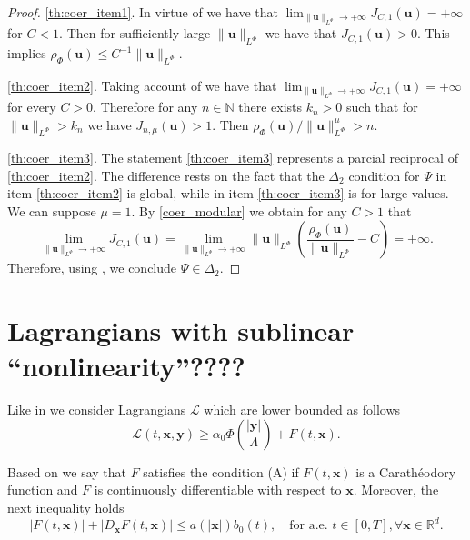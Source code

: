 \documentclass[twoside]{article}
\theoremstyle{remark}
\newcommand{\orlnor}{\|_{L^{\Phi}}}
\renewcommand{\b}[1]{\boldsymbol{#1}}
\newcommand{\rr}{\mathbb{R}}
\newcommand{\nn}{\mathbb{N}}
\renewcommand{\leq}{\leqslant}
\renewcommand{\geq}{\geqslant}
\begin{document}
\begin{proof} \ref{th:coer_item1}. In virtue of \cite[Lemma 5.2(1)]{ABGMS2015} we have that $\lim_{\|\b{u}\orlnor \to+\infty }J_{C,1}(\b{u})=+\infty$ for $C<1$. Then for sufficiently large $ \|\b{u}\orlnor$ we have that $J_{C,1}(\b{u})>0$. This implies $\rho_{\Phi}(\b{u})\leq C^{-1}\|\b{u}\orlnor$. 

\ref{th:coer_item2}. Taking account of \cite[Lemma 5.2(2)]{ABGMS2015} we have that $\lim_{\|\b{u}\orlnor \to+\infty }J_{C,1}(\b{u})=+\infty$ for every $C>0$. Therefore for any $n\in \nn$ there exists $k_n>0$ such that for $  \|\b{u}\orlnor>k_n$ we  have  $J_{n,\mu}(\b{u})>1$. Then $\rho_{\Phi}(\b{u})/ \|\b{u}\orlnor^{\mu}>n$. 

\ref{th:coer_item3}. The statement \ref{th:coer_item3} represents a parcial reciprocal of  \ref{th:coer_item2}. The difference rests on the fact that the $\Delta_2$ condition for $\Psi$  in item  \ref{th:coer_item2} is global, while in item   \ref{th:coer_item3} is for large values. We can suppose $\mu=1$. By \eqref{coer_modular} we obtain for any $C>1$ that
\[\lim_{   \|\b{u}\orlnor\to+\infty} J_{C,1}(\b{u})=\lim_{   \|\b{u}\orlnor\to+\infty}
 \|\b{u}\orlnor\left(\frac{\rho_{\Phi}(\b{u})}{ \|\b{u}\orlnor}-C\right)=+\infty.\]
 Therefore, using \cite[Lemma 5.2(3)]{ABGMS2015}, we conclude $\Psi\in\Delta_2$. 

\end{proof}










\section{Lagrangians with sublinear ``nonlinearity''????}


Like in \cite{ABGMS2015} we consider Lagrangians $\mathcal{L}$ which are lower bounded as follows 
\begin{equation}\label{cota_inf}
\mathcal{L}(t,\b{x},\b{y})\geq \alpha_0\Phi\left(\frac{|\b{y}|}{\Lambda}\right)+ F(t,\b{x}).
\end{equation}

Based on \cite{mawhin2010critical} we say that $F$ satisfies the condition (A) if  $F(t,\b{x})$ is a Carath\'eo\-dory function and  $F$ is continuously differentiable with respect to $\b{x}$. Moreover, the next inequality holds 
\begin{equation}\label{condA2}|F(t,\b{x})|+ |D_{\b{x}}F(t,\b{x})|\leq a(|\b{x}|)b_0(t),\quad\text{for a.e. }t\in [0,T], \forall\b{x}\in\rr^d.
\end{equation}
\end{document}
